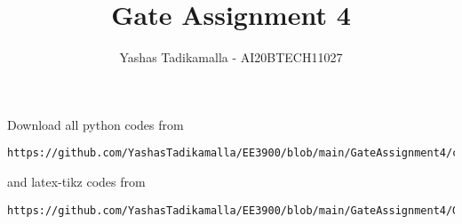 \documentclass[journal,12pt,twocolumn]{IEEEtran}
\DeclareMathOperator*{\Res}{Res}
\begin{document}
\newcommand{\BEQA}{\begin{eqnarray}}
\newcommand{\EEQA}{\end{eqnarray}}
\newcommand{\define}{\stackrel{\triangle}{=}}

\raggedbottom
\setlength{\parindent}{0pt}
\providecommand{\mbf}{\mathbf}
\providecommand{\pr}[1]{\ensuremath{\Pr\left(#1\right)}}
\providecommand{\qfunc}[1]{\ensuremath{Q\left(#1\right)}}
\providecommand{\sbrak}[1]{\ensuremath{{}\left[#1\right]}}
\providecommand{\lsbrak}[1]{\ensuremath{{}\left[#1\right.}}
\providecommand{\rsbrak}[1]{\ensuremath{{}\left.#1\right]}}
\providecommand{\brak}[1]{\ensuremath{\left(#1\right)}}
\providecommand{\lbrak}[1]{\ensuremath{\left(#1\right.}}
\providecommand{\rbrak}[1]{\ensuremath{\left.#1\right)}}
\providecommand{\cbrak}[1]{\ensuremath{\left\{#1\right\}}}
\providecommand{\lcbrak}[1]{\ensuremath{\left\{#1\right.}}
\providecommand{\rcbrak}[1]{\ensuremath{\left.#1\right\}}}
\theoremstyle{remark}
\newtheorem{rem}{Remark}
\newtheorem*{remark}{Remark}
\newcommand{\sgn}{\mathop{\mathrm{sgn}}}
\providecommand{\abs}[1]{\vert#1\vert}
\providecommand{\res}[1]{\Res\displaylimits_{#1}} 
\providecommand{\norm}[1]{\lVert#1\rVert}
\providecommand{\mtx}[1]{\mathbf{#1}}
\providecommand{\mean}[1]{E[ #1 ]}
\providecommand{\fourier}{\overset{\mathcal{F}}{ \rightleftharpoons}}
\providecommand{\system}{\overset{\mathcal{H}}{ \longleftrightarrow}}
\newcommand{\solution}{\noindent \textbf{Solution: }}
\newcommand{\cosec}{\,\text{cosec}\,}
\providecommand{\dec}[2]{\ensuremath{\overset{#1}{\underset{#2}{\gtrless}}}}
\newcommand{\myvec}[1]{\ensuremath{\begin{pmatrix}#1\end{pmatrix}}}
\newcommand{\mydet}[1]{\ensuremath{\begin{vmatrix}#1\end{vmatrix}}}
\makeatletter
{}
\makeatother
\let\StandardTheFigure\thefigure
\let\vec\mathbf
\renewcommand{\thefigure}{\theproblem}
\def\putbox#1#2#3{\makebox[0in][l]{\makebox[#1][l]{}\raisebox{\baselineskip}[0in][0in]{\raisebox{#2}[0in][0in]{#3}}}}
     \def\rightbox#1{\makebox[0in][r]{#1}}
     \def\centbox#1{\makebox[0in]{#1}}
     \def\topbox#1{\raisebox{-\baselineskip}[0in][0in]{#1}}
     \def\midbox#1{\raisebox{-0.5\baselineskip}[0in][0in]{#1}}
\vspace{3cm}
\title{Gate Assignment 4}
\author{Yashas Tadikamalla - AI20BTECH11027}
\maketitle
\newpage
\bigskip
\renewcommand{\thefigure}{\theenumi}
\renewcommand{\thetable}{\theenumi}
Download all python codes from 
\begin{lstlisting}
https://github.com/YashasTadikamalla/EE3900/blob/main/GateAssignment4/codes
\end{lstlisting}
%
and latex-tikz codes from 
%
\begin{lstlisting}
https://github.com/YashasTadikamalla/EE3900/blob/main/GateAssignment4/GateAssignment4.tex
\end{lstlisting}
\end{document}
